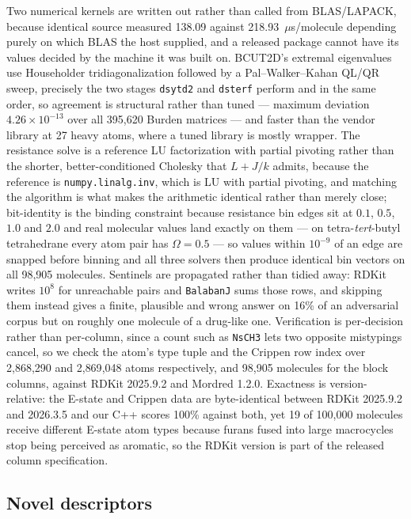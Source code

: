 Two numerical kernels are written out rather than called from BLAS/LAPACK, because identical
source measured 138.09 against 218.93~$\mu$s/molecule depending purely on which BLAS the host
supplied, and a released package cannot have its values decided by the machine it was built on.
BCUT2D's extremal eigenvalues use Householder tridiagonalization followed by a
Pal--Walker--Kahan QL/QR sweep, precisely the two stages \texttt{dsytd2} and \texttt{dsterf}
perform and in the same order, so agreement is structural rather than tuned --- maximum deviation
$4.26 \times 10^{-13}$ over all 395{,}620 Burden matrices --- and faster than the vendor library
at 27 heavy atoms, where a tuned library is mostly wrapper. The resistance solve is a reference
LU factorization with partial pivoting rather than the shorter, better-conditioned Cholesky that
$L + J/k$ admits, because the reference is \texttt{numpy.linalg.inv}, which is LU with partial
pivoting, and matching the algorithm is what makes the arithmetic identical rather than merely
close; bit-identity is the binding constraint because resistance bin edges sit at $0.1$, $0.5$,
$1.0$ and $2.0$ and real molecular values land exactly on them --- on tetra-\emph{tert}-butyl
tetrahedrane every atom pair has $\Omega = 0.5$ --- so values within $10^{-9}$ of an edge are
snapped before binning and all three solvers then produce identical bin vectors on all 98{,}905
molecules. Sentinels are propagated rather than tidied away: RDKit writes $10^8$ for unreachable
pairs and \texttt{BalabanJ} sums those rows, and skipping them instead gives a finite, plausible
and wrong answer on 16\% of an adversarial corpus but on roughly one molecule of a drug-like one.
Verification is per-decision rather than per-column, since a count such as \texttt{NsCH3} lets
two opposite mistypings cancel, so we check the atom's type tuple and the Crippen row index over
2{,}868{,}290 and 2{,}869{,}048 atoms respectively, and 98{,}905 molecules for the block columns,
against RDKit 2025.9.2 and Mordred 1.2.0. Exactness is version-relative: the E-state and Crippen
data are byte-identical between RDKit 2025.9.2 and 2026.3.5 and our C++ scores 100\% against
both, yet 19 of 100{,}000 molecules receive different E-state atom types because furans fused
into large macrocycles stop being perceived as aromatic, so the RDKit version is part of the
released column specification.

\subsection{Novel descriptors}

